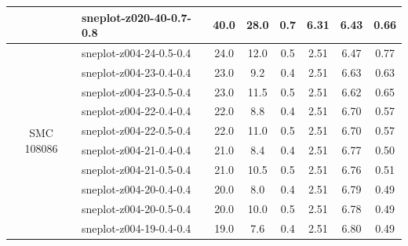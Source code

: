 \begin{table}
\begin{tabular}{c|l|c|c|c|c||c|c}
                                      & sneplot-z020-40-0.7-0.8 &          40.0          &          28.0          &   0.7   &        6.31         & 6.43                  & 0.66                     \\
                                        \midrule
         \multirow{10}{*}{SMC 108086} & sneplot-z004-24-0.5-0.4 &          24.0          &          12.0          &   0.5   &        2.51         & 6.47                  & 0.77                     \\
                                      & sneplot-z004-23-0.4-0.4 &          23.0          &          9.2           &   0.4   &        2.51         & 6.63                  & 0.63                     \\
                                      & sneplot-z004-23-0.5-0.4 &          23.0          &          11.5          &   0.5   &        2.51         & 6.62                  & 0.65                     \\
                                      & sneplot-z004-22-0.4-0.4 &          22.0          &          8.8           &   0.4   &        2.51         & 6.70                  & 0.57                     \\
                                      & sneplot-z004-22-0.5-0.4 &          22.0          &          11.0          &   0.5   &        2.51         & 6.70                  & 0.57                     \\
                                      & sneplot-z004-21-0.4-0.4 &          21.0          &          8.4           &   0.4   &        2.51         & 6.77                  & 0.50                     \\
                                      & sneplot-z004-21-0.5-0.4 &          21.0          &          10.5          &   0.5   &        2.51         & 6.76                  & 0.51                     \\
                                      & sneplot-z004-20-0.4-0.4 &          20.0          &          8.0           &   0.4   &        2.51         & 6.79                  & 0.49                     \\
                                      & sneplot-z004-20-0.5-0.4 &          20.0          &          10.0          &   0.5   &        2.51         & 6.78                  & 0.49                     \\
                                      & sneplot-z004-19-0.4-0.4 &          19.0          &          7.6           &   0.4   &        2.51         & 6.80                  & 0.49                     \\

\end{tabular}
\end{table}
